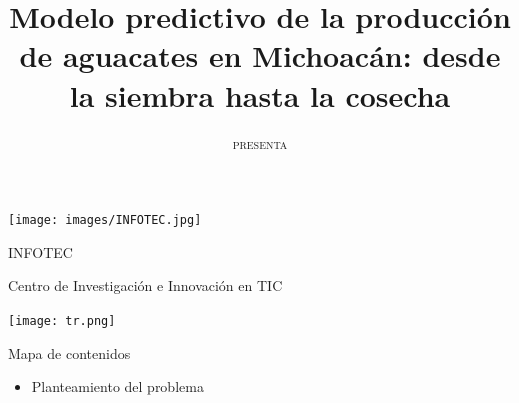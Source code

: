 \documentclass[aspectratio=169]{beamer}
\title[]{\Large\centering
\color{airforceblue}Modelo predictivo de la producción de aguacates en Michoacán: desde la siembra hasta la cosecha}
\author{{\small \textsc{presenta}}\centering{\\Isaac Vázquez Mendoza \\ {\small\textsc{
		bajo la dirección de}}\\ Dra. Magali Arellano Vázquez}}
\institute{}
\begin{document}
	\begin{frame}[noframenumbering]
		
		\begin{minipage}{0.15\textwidth}
			\centering
			\hspace{0.3cm}\vspace{-0.6cm}\texttt{[image: images/INFOTEC.jpg]}
		\end{minipage}%
		\begin{minipage}{0.65\textwidth}
			\centering \vspace{0.5cm}
			\hspace{1cm}INFOTEC
			
			\hspace{1cm}Centro de Investigación e Innovación en TIC
                \hspace{1cm}
   
		\end{minipage}%
		\begin{minipage}{0.2\textwidth}
			\texttt{[image: tr.png]}
                \hspace*{0.5cm}%
		\end{minipage}
		\date{}
		\titlepage
		
		
		
	\end{frame}
%
%


%
%



{
	\begin{frame}{Mapa de contenidos}
		\begin{itemize}
			\color{airforceblue}
			\item Planteamiento del problema
		\end{itemize}
	\end{frame}
}
\end{document}
